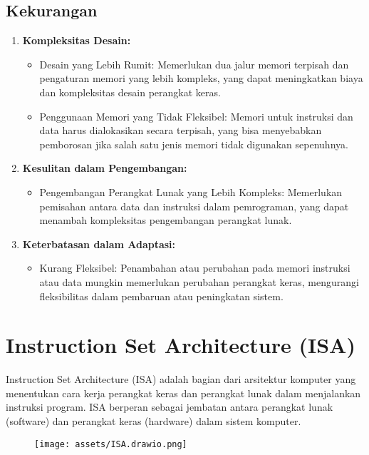 \documentclass{article}
\begin{document}
\subsection{Kekurangan}

\begin{enumerate}[label=\arabic*.]
  \item \textbf{Kompleksitas Desain:}
  \begin{itemize}
    \item Desain yang Lebih Rumit: Memerlukan dua jalur memori terpisah dan pengaturan memori yang lebih kompleks, yang dapat meningkatkan biaya dan kompleksitas desain perangkat keras.
    \item Penggunaan Memori yang Tidak Fleksibel: Memori untuk instruksi dan data harus dialokasikan secara terpisah, yang bisa menyebabkan pemborosan jika salah satu jenis memori tidak digunakan sepenuhnya.
  \end{itemize}
  
  \item \textbf{Kesulitan dalam Pengembangan:}
  \begin{itemize}
    \item Pengembangan Perangkat Lunak yang Lebih Kompleks: Memerlukan pemisahan antara data dan instruksi dalam pemrograman, yang dapat menambah kompleksitas pengembangan perangkat lunak.
  \end{itemize}
  
  \item \textbf{Keterbatasan dalam Adaptasi:}
  \begin{itemize}
    \item Kurang Fleksibel: Penambahan atau perubahan pada memori instruksi atau data mungkin memerlukan perubahan perangkat keras, mengurangi fleksibilitas dalam pembaruan atau peningkatan sistem.
  \end{itemize}
\end{enumerate}

\section{Instruction Set Architecture (ISA)}
Instruction Set Architecture (ISA) adalah bagian dari arsitektur komputer yang menentukan cara kerja perangkat keras dan perangkat lunak dalam menjalankan instruksi program. ISA berperan sebagai jembatan antara perangkat lunak (software) dan perangkat keras (hardware) dalam sistem komputer.
\begin{figure}
    \centering
    \texttt{[image: assets/ISA.drawio.png]}
    \caption{}
    \label{fig:enter-label}
\end{figure}
\end{document}
